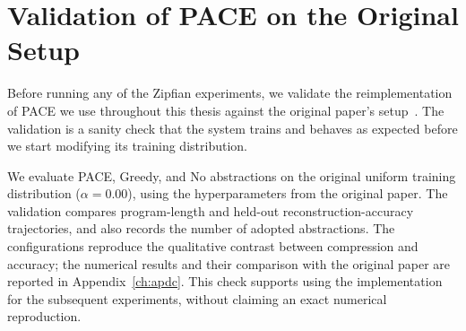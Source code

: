 \section{Validation of PACE on the Original Setup}
\label{sec:framework-validation}

Before running any of the Zipfian experiments, we validate the reimplementation of PACE we use throughout this thesis against the original paper's setup~\cite{thomas_pace_2025}. The validation is a sanity check that the system trains and behaves as expected before we start modifying its training distribution.

We evaluate PACE, Greedy, and No abstractions on the original uniform training distribution ($\alpha = 0.00$), using the hyperparameters from the original paper. The validation compares program-length and held-out reconstruction-accuracy trajectories, and also records the number of adopted abstractions. The configurations reproduce the qualitative contrast between compression and accuracy; the numerical results and their comparison with the original paper are reported in Appendix~\ref{ch:apdc}. This check supports using the implementation for the subsequent experiments, without claiming an exact numerical reproduction.